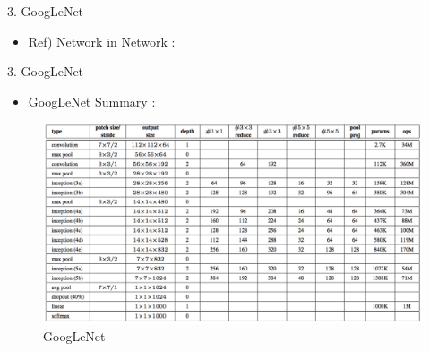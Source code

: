 \documentclass{beamer}
\begin{document}
\begin{frame}{3. GoogLeNet}
	\vspace{10pt}
	\begin{itemize}
		\item Ref) Network in Network :
	\end{itemize}
	\vspace{10pt}
	\begin{figure}[h]		
		\centering
		\quad
		\label{nin}
	\end{figure}
\end{frame}


\begin{frame}{3. GoogLeNet}
	\vspace{10pt}
	\begin{itemize}
		\item GoogLeNet Summary :
	\end{itemize}
	\vspace{10pt}
	\begin{figure}[h]		
		\centering
		\includegraphics[scale=0.4]{./google/googlenet_3.PNG}
		\caption{GoogLeNet}
		\label{googlenet}
	\end{figure}
\end{frame}
\end{document}
